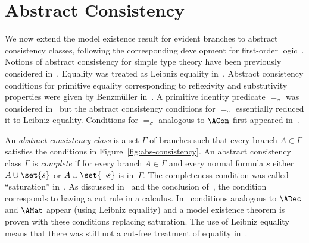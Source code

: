 \section{Abstract Consistency}

We now extend the model existence result for evident
branches to abstract consistency classes, following the
corresponding development for first-order
logic~\cite{SmullyanBook}.
Notions of abstract consistency for simple type theory have
been previously considered in~\cite{Andrews71,Kohlhase93a,KohlhaseTableaux1995,Benzmuller99a,BenzKoh98,BBK04,BBKweb04,Brown2004a,BrownARHO}.
Equality was treated as Leibniz equality in~\cite{Andrews71}.
Abstract consistency conditions for
primitive equality corresponding to reflexivity and substutivity properties
were given by Benzm\"uller in~\cite{Benzmuller99a,Benzmuller99b}. 
A primitive identity predicate $=_\sigma$ was considered in~\cite{BBK04}
but the abstract consistency conditions for $=_\sigma$ essentially reduced it
to Leibniz equality.  
Conditions for $=_\sigma$ analogous to $\ACon$ first appeared in~\cite{Brown2004a}.

An \emph{abstract consistency class} is a set $\Gamma$
of branches such that every branch $A\in\Gamma$
satisfies the conditions in
Figure~\ref{fig:abs-consistency}.  An abstract
consistency class $\Gamma$ is \emph{complete} if for
every branch $A\in\Gamma$ and every normal formula $s$
either $A\cup\set{{s}}$ or $A\cup\set{\neg{s}}$ is
in~$\Gamma$.  
The completeness condition was called ``saturation'' in~\cite{BBK04}.
As discussed in~\cite{BBK2009} and the conclusion of~\cite{BBK04},
the condition corresponds to having a cut rule in a calculus.
In~\cite{BBKweb04} conditions analogous to $\ADec$ and $\AMat$ appear (using Leibniz equality)
and a model existence theorem is proven with these conditions replacing saturation.
The use of Leibniz equality means that there was still not a cut-free treatment of equality in~\cite{BBKweb04}.


